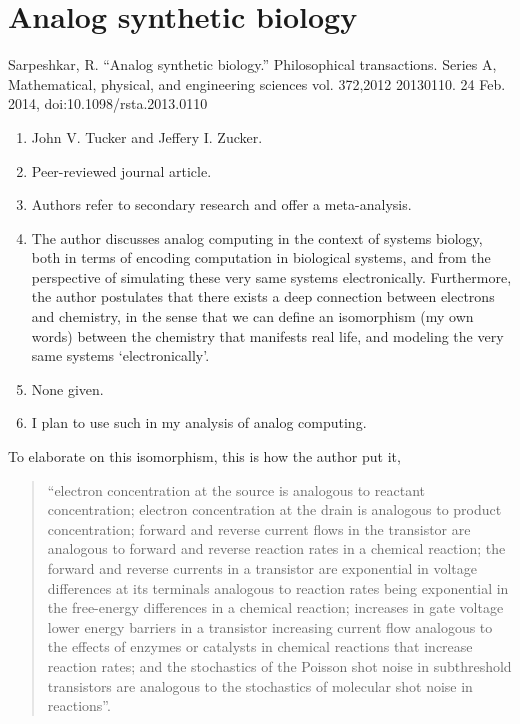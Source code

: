 \section*{Analog synthetic biology}

Sarpeshkar, R. “Analog synthetic biology.” Philosophical transactions. Series A, Mathematical, physical, and engineering sciences vol. 372,2012 20130110. 24 Feb. 2014, doi:10.1098/rsta.2013.0110

\begin{enumerate}
    \item John V. Tucker and Jeffery I. Zucker.
    \item Peer-reviewed journal article.
    \item Authors refer to secondary research and offer a meta-analysis.
    \item The author discusses analog computing in the context of systems biology, both in terms of encoding computation in biological systems, and from the perspective of simulating these very same systems electronically. Furthermore, the author postulates that there exists a deep connection between electrons and chemistry, in the sense that we can define an isomorphism (my own words) between the chemistry that manifests real life, and modeling the very same systems `electronically'.  
    \item None given. 
    \item I plan to use such in my analysis of analog computing. 
\end{enumerate}

To elaborate on this isomorphism, this is how the author put it,

\begin{quotation}
    ``electron concentration at the source is analogous to reactant concentration; electron concentration at the drain is analogous to product concentration; forward and reverse current flows in the transistor are analogous to forward and reverse reaction rates in a chemical reaction; the forward and reverse currents in a transistor are exponential in voltage differences at its terminals analogous to reaction rates being exponential in the free-energy differences in a chemical reaction; increases in gate voltage lower energy barriers in a transistor increasing current flow analogous to the effects of enzymes or catalysts in chemical reactions that increase reaction rates; and the stochastics of the Poisson shot noise in subthreshold transistors are analogous to the stochastics of molecular shot noise in reactions''.
\end{quotation}

